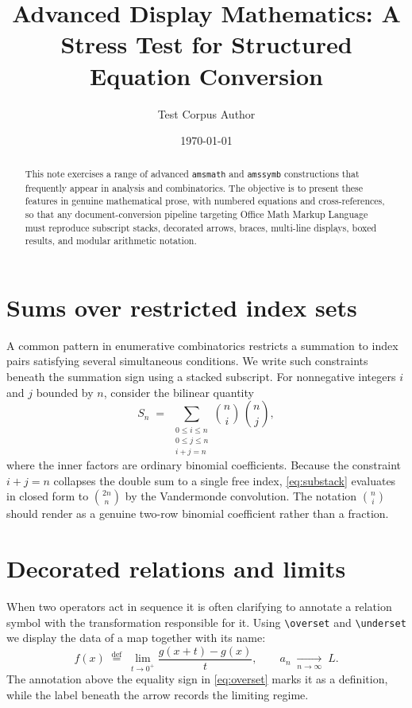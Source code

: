 \documentclass[11pt]{article}
\title{Advanced Display Mathematics: A Stress Test for Structured Equation Conversion}
\author{Test Corpus Author}
\date{\today}
\begin{document}
\maketitle

\begin{abstract}
This note exercises a range of advanced \texttt{amsmath} and \texttt{amssymb}
constructions that frequently appear in analysis and combinatorics. The
objective is to present these features in genuine mathematical prose, with
numbered equations and cross-references, so that any document-conversion
pipeline targeting Office Math Markup Language must reproduce subscript stacks,
decorated arrows, braces, multi-line displays, boxed results, and modular
arithmetic notation.
\end{abstract}

\section{Sums over restricted index sets}
\label{sec:sums}

A common pattern in enumerative combinatorics restricts a summation to index
pairs satisfying several simultaneous conditions. We write such constraints
beneath the summation sign using a stacked subscript. For nonnegative integers
$i$ and $j$ bounded by $n$, consider the bilinear quantity
\begin{equation}
\label{eq:substack}
S_n \;=\; \sum_{\substack{0 \le i \le n \\ 0 \le j \le n \\ i + j = n}}
   \binom{n}{i}\, \binom{n}{j},
\end{equation}
where the inner factors are ordinary binomial coefficients. Because the
constraint $i + j = n$ collapses the double sum to a single free index,
\cref{eq:substack} evaluates in closed form to $\binom{2n}{n}$ by the
Vandermonde convolution. The notation $\binom{n}{i}$ should render as a genuine
two-row binomial coefficient rather than a fraction.

\section{Decorated relations and limits}
\label{sec:decorated}

When two operators act in sequence it is often clarifying to annotate a relation
symbol with the transformation responsible for it. Using \verb|\overset| and
\verb|\underset| we display the data of a map together with its name:
\begin{equation}
\label{eq:overset}
f(x) \;\overset{\text{def}}{=}\; \lim_{t \to 0^{+}} \frac{g(x+t) - g(x)}{t},
\qquad
a_n \;\underset{n \to \infty}{\longrightarrow}\; L .
\end{equation}
The annotation above the equality sign in \cref{eq:overset} marks it as a
definition, while the label beneath the arrow records the limiting regime.
\end{document}
